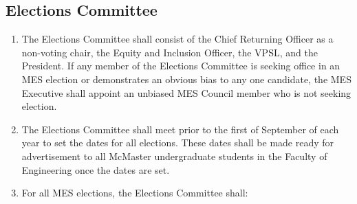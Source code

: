 \subsection{Elections Committee}
\label{elections-committee-guidelines}
\begin{enumerate}
 \item
  The Elections Committee shall consist of the Chief Returning Officer
  as a non-voting chair, the Equity and Inclusion Officer, the VPSL,
  and the President. If any member of the Elections Committee is seeking
  office in an MES election or demonstrates an obvious bias to any one
  candidate, the MES Executive shall appoint an unbiased MES Council
  member who is not seeking election. %
 \item
  The Elections Committee shall meet prior to the first of September of
  each year to set the dates for all elections. These dates shall be
  made ready for advertisement to all McMaster undergraduate students in
  the Faculty of Engineering once the dates are set.
 \item
  For all MES elections, the Elections Committee shall:


\end{enumerate}
